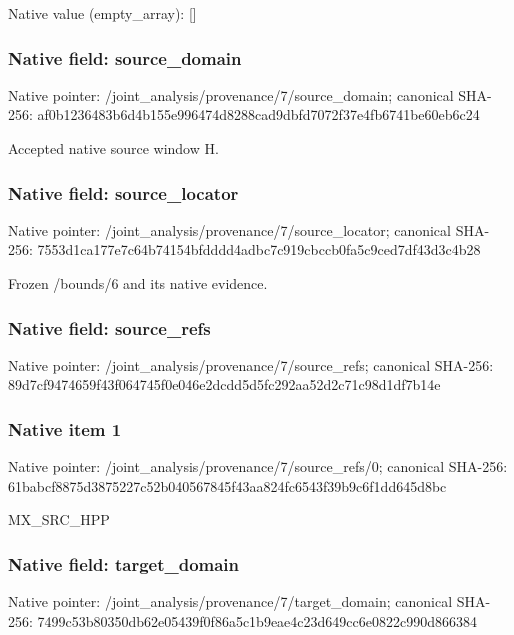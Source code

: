 \documentclass[10pt,a4paper]{article}
\begin{document}
Native value (empty\_\allowbreak{}array): []

\subsubsection{Native field: source\_\allowbreak{}domain}
Native pointer: /joint\_\allowbreak{}analysis/provenance/7/source\_\allowbreak{}domain; canonical SHA-256: af0b1236483b6d4b155e996474d8288cad9dbfd7072f37e4fb6741be60eb6c24

\begingroup\raggedright\sloppy Accepted native source window H.\par\endgroup

\subsubsection{Native field: source\_\allowbreak{}locator}
Native pointer: /joint\_\allowbreak{}analysis/provenance/7/source\_\allowbreak{}locator; canonical SHA-256: 7553d1ca177e7c64b74154bfdddd4adbc7c919cbccb0fa5c9ced7df43d3c4b28

\begingroup\raggedright\sloppy Frozen /\allowbreak{}bounds/\allowbreak{}6 and its native evidence.\par\endgroup

\subsubsection{Native field: source\_\allowbreak{}refs}
Native pointer: /joint\_\allowbreak{}analysis/provenance/7/source\_\allowbreak{}refs; canonical SHA-256: 89d7cf9474659f43f064745f0e046e2dcdd5d5fc292aa52d2c71c98d1df7b14e

\subsubsection{Native item 1}
Native pointer: /joint\_\allowbreak{}analysis/provenance/7/source\_\allowbreak{}refs/0; canonical SHA-256: 61babcf8875d3875227c52b040567845f43aa824fc6543f39b9c6f1dd645d8bc

\begingroup\raggedright\sloppy MX\_\allowbreak{}SRC\_\allowbreak{}HPP\par\endgroup

\subsubsection{Native field: target\_\allowbreak{}domain}
Native pointer: /joint\_\allowbreak{}analysis/provenance/7/target\_\allowbreak{}domain; canonical SHA-256: 7499c53b80350db62e05439f0f86a5c1b9eae4c23d649cc6e0822c990d866384
\end{document}
